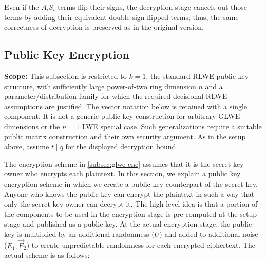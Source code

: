 Even if the $A_iS_i$ terms flip their signs, the decryption stage cancels out those terms by adding their equivalent double-sign-flipped terms; thus, the same correctness of decryption is preserved as in the original version.  





\subsection{Public Key Encryption}
\label{subsec:glwe-public-key-enc}

\textbf{Scope:} This subsection is restricted to $k=1$, the standard RLWE public-key structure, with sufficiently large power-of-two ring dimension $n$ and a parameter/distribution family for which the required decisional RLWE assumptions are justified. The vector notation below is retained with a single component. It is not a generic public-key construction for arbitrary GLWE dimensions or the $n=1$ LWE special case. Such generalizations require a suitable public matrix construction and their own security argument. As in the setup above, assume $t\mid q$ for the displayed decryption bound.


The encryption scheme in \autoref{subsec:glwe-enc} assumes that it is the secret key owner who encrypts each plaintext. In this section, we explain a public key encryption scheme in which we create a public key counterpart of the secret key. Anyone who knows the public key can encrypt the plaintext in such a way that only the secret key owner can decrypt it. The high-level idea is that a portion of the components to be used in the encryption stage is pre-computed at the setup stage and published as a public key. At the actual encryption stage, the public key is multiplied by an additional randomness ($U$) and added to additional noise ($E_1, \vec{E}_2$) to create unpredictable randomness for each encrypted ciphertext. The actual scheme is as follows: 

